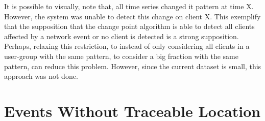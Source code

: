 It is possible to visually, note that, all time series changed it pattern at
time X. However, the system was unable to detect this change on client X.
This exemplify that the supposition that the change point algorithm is able to
detect all clients affected by a network event or no client is detected is a
strong supposition. Perhaps, relaxing this restriction, to instead of only
considering all clients in a user-group with the same pattern, to consider a
big fraction with the same pattern, can reduce this problem. However, since the
current dataset is small, this approach was not done.

\section{Events Without Traceable Location}
\label{sec:events_without_traceable_location}
